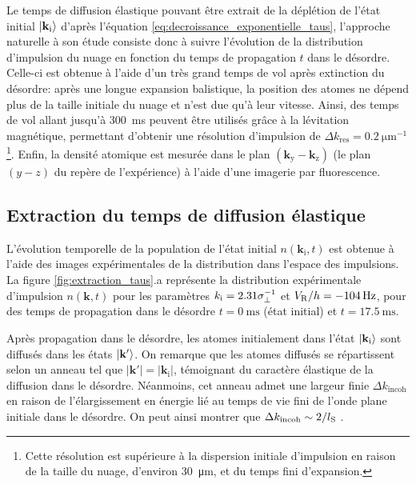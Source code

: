 Le temps de diffusion élastique pouvant être extrait de la déplétion de l'état initial $\left| \mathbf{k}_{\mathrm{i}} \right\rangle$ d'après l'équation \ref{eq:decroissance_exponentielle_taus}, l'approche naturelle à son étude consiste donc à suivre l'évolution de la distribution d'impulsion du nuage en fonction du temps de propagation $t$ dans le désordre. Celle-ci est obtenue à l'aide d'un très grand temps de vol après extinction du désordre: après une longue expansion balistique, la position des atomes ne dépend plus de la taille initiale du nuage et n'est due qu'à leur vitesse. Ainsi, des temps de vol allant jusqu'à \SI{300}{\milli\second} peuvent être utilisés grâce à la lévitation magnétique, permettant d'obtenir une résolution d'impulsion de $\Delta k_{\mathrm{res}}=\SI{0.2}{\micro\metre^{-1}}$\footnote{Cette résolution est supérieure à la dispersion initiale d'impulsion en raison de la taille du nuage, d'environ \SI{30}{\micro\metre}, et du temps fini d'expansion.}. Enfin, la densité atomique est mesurée dans le plan $(\mathbf{k}_{\mathrm{y}}-\mathbf{k}_{\mathrm{z}})$ (le plan $(y-z)$ du repère de l'expérience) à l'aide d'une imagerie par fluorescence.

\subsection{Extraction du temps de diffusion élastique}
\label{sc:traitement_donnees_extraction_taus}

L'évolution temporelle de la population de l'état initial $n(\mathbf{k}_{\mathrm{i}},t)$ est obtenue à l'aide des images expérimentales de la distribution dans l'espace des impulsions. La figure \ref{fig:extraction_taus}.a représente la distribution expérimentale d'impulsion $n(\mathbf{k},t)$ pour les paramètres $k_{\mathrm{i}}=2.31\sigma_{\perp}^{-1}$ et $V_{\mathrm{R}}/h=\SI{-104}{\hertz}$, pour des temps de propagation dans le désordre $t=\SI{0}{\milli\second}$ (état initial) et $t=\SI{17.5}{\milli\second}$. 

Après propagation dans le désordre, les atomes initialement dans l'état $\left| \mathbf{k}_{\mathrm{i}} \right\rangle$ sont diffusés dans les états $\left| \mathbf{k}' \right\rangle$. On remarque que les atomes diffusés se répartissent selon un anneau tel que $|\mathbf{k}'|=|\mathbf{k}_{\mathrm{i}}|$, témoignant du caractère élastique de la diffusion dans le désordre. Néanmoins, cet anneau admet une largeur finie $\Delta k_{\mathrm{incoh}}$ en raison de l'élargissement en énergie lié au temps de vie fini de l'onde plane initiale dans le désordre. On peut ainsi montrer que $\Delta k_{\mathrm{incoh}}\sim 2/l_{\mathrm{S}}$ \citep{cherroret2012coherent}.

